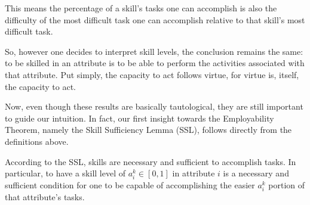 \documentclass[hidelinks, nonatbib]{elsarticle}
\begin{document}
\begin{definition}[Skill]
    This means the percentage of a skill's tasks one can accomplish is also
    the difficulty of the most difficult task one can accomplish relative to that
    skill's most difficult task.

    So, however one decides to interpret skill levels, the conclusion remains the
    same: to be skilled in an attribute is to be able to perform the activities
    associated with that attribute. Put simply, the capacity to act follows virtue,
    for virtue is, itself, the capacity to act.
\end{definition}
Now, even though these results are basically tautological, they are still important to guide our intuition. In fact, our first insight towards the Employability Theorem, namely the Skill Sufficiency Lemma (SSL), follows directly from the definitions above.
\begin{lemma}
    \label{ssl}
    According to the SSL, skills are necessary and sufficient to accomplish tasks.
    In particular, to have a skill level of $a_{i}^{k} \in [0,1]$ in attribute $i$ is a necessary and sufficient condition for one to be capable of accomplishing the easier $a_{i}^{k}$ portion of that attribute's tasks.
\end{lemma}
\end{document}
